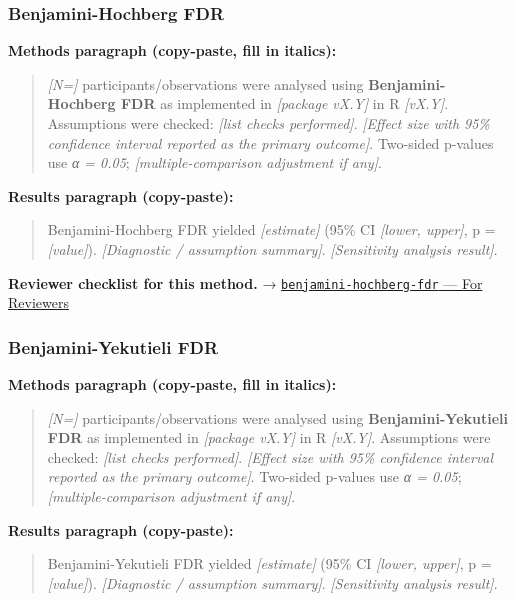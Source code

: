 \documentclass[
]{article}
\begin{document}
\subsubsection{Benjamini-Hochberg FDR}\label{benjamini-hochberg-fdr}

\textbf{Methods paragraph (copy-paste, fill in italics):}

\begin{quote}
\emph{{[}N={]}} participants/observations were analysed using
\textbf{Benjamini-Hochberg FDR} as implemented in \emph{{[}package
vX.Y{]}} in R \emph{{[}vX.Y{]}}. Assumptions were checked: \emph{{[}list
checks performed{]}}. \emph{{[}Effect size with 95\% confidence interval
reported as the primary outcome{]}}. Two-sided p-values use \emph{α =
0.05}; \emph{{[}multiple-comparison adjustment if any{]}}.
\end{quote}

\textbf{Results paragraph (copy-paste):}

\begin{quote}
Benjamini-Hochberg FDR yielded \emph{{[}estimate{]}} (95\% CI
\emph{{[}lower, upper{]}}, p = \emph{{[}value{]}}). \emph{{[}Diagnostic
/ assumption summary{]}}. \emph{{[}Sensitivity analysis result{]}}.
\end{quote}

\textbf{Reviewer checklist for this method.} →
\href{../chapters/04-inferential/benjamini-hochberg-fdr.Rmd\#for-reviewers}{\texttt{benjamini-hochberg-fdr}
--- For Reviewers}

\subsubsection{Benjamini-Yekutieli FDR}\label{benjamini-yekutieli-fdr}

\textbf{Methods paragraph (copy-paste, fill in italics):}

\begin{quote}
\emph{{[}N={]}} participants/observations were analysed using
\textbf{Benjamini-Yekutieli FDR} as implemented in \emph{{[}package
vX.Y{]}} in R \emph{{[}vX.Y{]}}. Assumptions were checked: \emph{{[}list
checks performed{]}}. \emph{{[}Effect size with 95\% confidence interval
reported as the primary outcome{]}}. Two-sided p-values use \emph{α =
0.05}; \emph{{[}multiple-comparison adjustment if any{]}}.
\end{quote}

\textbf{Results paragraph (copy-paste):}

\begin{quote}
Benjamini-Yekutieli FDR yielded \emph{{[}estimate{]}} (95\% CI
\emph{{[}lower, upper{]}}, p = \emph{{[}value{]}}). \emph{{[}Diagnostic
/ assumption summary{]}}. \emph{{[}Sensitivity analysis result{]}}.
\end{quote}
\end{document}
